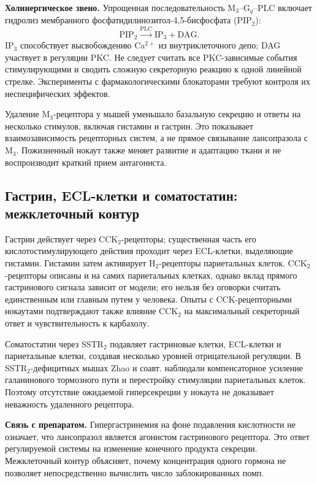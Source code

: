 \documentclass[11pt,a4paper,notitlepage]{report}
\newcommand{\src}[1]{\unskip\space\cite{#1}}
\begin{document}
\textbf{Холинергическое звено.} Упрощенная последовательность M$_3$--G$_q$--PLC включает гидролиз мембранного фосфатидилинозитол-4,5-бисфосфата (PIP$_2$):
\[
\mathrm{PIP}_2\xrightarrow{\mathrm{PLC}}\mathrm{IP}_3+\mathrm{DAG}.
\]
IP$_3$ способствует высвобождению Ca$^{2+}$ из внутриклеточного депо; DAG участвует в регуляции PKC. Не следует считать все PKC-зависимые события стимулирующими и сводить сложную секреторную реакцию к одной линейной стрелке. Эксперименты с фармакологическими блокаторами требуют контроля их неспецифических эффектов.\src{molprobes}

Удаление M$_3$-рецептора у мышей уменьшало базальную секрецию и ответы на несколько стимулов, включая гистамин и гастрин. Это показывает взаимозависимость рецепторных систем, а не прямое связывание лансопразола с M$_3$. Пожизненный нокаут также меняет развитие и адаптацию ткани и не воспроизводит краткий прием антагониста.\src{molm3}

\subsection{Гастрин, ECL-клетки и соматостатин: межклеточный контур}
Гастрин действует через CCK$_2$-рецепторы; существенная часть его кислотостимулирующего действия проходит через ECL-клетки, выделяющие гистамин. Гистамин затем активирует H$_2$-рецепторы париетальных клеток. CCK$_2$-рецепторы описаны и на самих париетальных клетках, однако вклад прямого гастринового сигнала зависит от модели; его нельзя без оговорки считать единственным или главным путем у человека. Опыты с CCK-рецепторными нокаутами подтверждают также влияние CCK$_2$ на максимальный секреторный ответ и чувствительность к карбахолу.\src{molcck}

Соматостатин через SSTR$_2$ подавляет гастриновые клетки, ECL-клетки и париетальные клетки, создавая несколько уровней отрицательной регуляции. В SSTR$_2$-дефицитных мышах Zhao и соавт. наблюдали компенсаторное усиление галанинового тормозного пути и перестройку стимуляции париетальных клеток. Поэтому отсутствие ожидаемой гиперсекреции у нокаута не доказывает неважность удаленного рецептора.\src{molsst}

\textbf{Связь с препаратом.} Гипергастринемия на фоне подавления кислотности не означает, что лансопразол является агонистом гастринового рецептора. Это ответ регулируемой системы на изменение конечного продукта секреции. Межклеточный контур объясняет, почему концентрация одного гормона не позволяет непосредственно вычислить число заблокированных помп.\src{uslabel,molsst}
\end{document}
